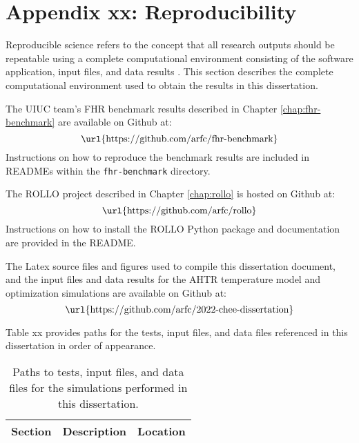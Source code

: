 \chapter{Appendix xx: Reproducibility} 

Reproducible science refers to the concept that all research outputs should be 
repeatable using a complete computational environment consisting of the software 
application, input files, and data results \cite{novak_multiscale_2020}.
This section describes the complete computational environment used to obtain the 
results in this dissertation.

The UIUC team's \gls{FHR} benchmark results described in Chapter \ref{chap:fhr-benchmark} 
are available on Github at: 
\begin{equation*}
\mbox{\url{https://github.com/arfc/fhr-benchmark}}
\end{equation*}
Instructions on how to reproduce the benchmark results are included in READMEs within 
the \texttt{fhr-benchmark} directory. 

The \gls{ROLLO} project described in Chapter \ref{chap:rollo} is hosted on Github at: 
\begin{equation*}
    \mbox{\url{https://github.com/arfc/rollo}}
\end{equation*}
Instructions on how to install the \gls{ROLLO} Python package and documentation are 
provided in the README. 

The Latex source files and figures used to compile this dissertation document, and 
the input files and data results for the AHTR temperature model and optimization 
simulations are available on Github at:  
\begin{equation*}
    \mbox{\url{https://github.com/arfc/2022-chee-dissertation}}
\end{equation*}

Table xx provides paths for the tests, input files, and data files referenced in this 
dissertation in order of appearance. 

\begin{landscape}
\begin{table}[htbp!]
    \centering
    \onehalfspacing
    \caption{Paths to tests, input files, and data files for the simulations performed 
    in this dissertation. }
    \label{tab:reproducibility}
    \footnotesize
    \begin{tabular}{lll}
    \hline 
    \textbf{Section} & \textbf{Description} & \textbf{Location} \\
    \hline
    \hline
    \end{tabular}
\end{table}
\end{landscape}
